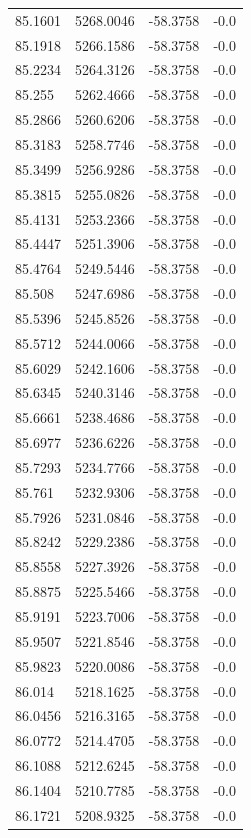 \begin{table}[H]
\begin{tabular}{llll}
85.1601 & 5268.0046 & -58.3758 & -0.0 \\
85.1918 & 5266.1586 & -58.3758 & -0.0 \\
85.2234 & 5264.3126 & -58.3758 & -0.0 \\
85.255 & 5262.4666 & -58.3758 & -0.0 \\
85.2866 & 5260.6206 & -58.3758 & -0.0 \\
85.3183 & 5258.7746 & -58.3758 & -0.0 \\
85.3499 & 5256.9286 & -58.3758 & -0.0 \\
85.3815 & 5255.0826 & -58.3758 & -0.0 \\
85.4131 & 5253.2366 & -58.3758 & -0.0 \\
85.4447 & 5251.3906 & -58.3758 & -0.0 \\
85.4764 & 5249.5446 & -58.3758 & -0.0 \\
85.508 & 5247.6986 & -58.3758 & -0.0 \\
85.5396 & 5245.8526 & -58.3758 & -0.0 \\
85.5712 & 5244.0066 & -58.3758 & -0.0 \\
85.6029 & 5242.1606 & -58.3758 & -0.0 \\
85.6345 & 5240.3146 & -58.3758 & -0.0 \\
85.6661 & 5238.4686 & -58.3758 & -0.0 \\
85.6977 & 5236.6226 & -58.3758 & -0.0 \\
85.7293 & 5234.7766 & -58.3758 & -0.0 \\
85.761 & 5232.9306 & -58.3758 & -0.0 \\
85.7926 & 5231.0846 & -58.3758 & -0.0 \\
85.8242 & 5229.2386 & -58.3758 & -0.0 \\
85.8558 & 5227.3926 & -58.3758 & -0.0 \\
85.8875 & 5225.5466 & -58.3758 & -0.0 \\
85.9191 & 5223.7006 & -58.3758 & -0.0 \\
85.9507 & 5221.8546 & -58.3758 & -0.0 \\
85.9823 & 5220.0086 & -58.3758 & -0.0 \\
86.014 & 5218.1625 & -58.3758 & -0.0 \\
86.0456 & 5216.3165 & -58.3758 & -0.0 \\
86.0772 & 5214.4705 & -58.3758 & -0.0 \\
86.1088 & 5212.6245 & -58.3758 & -0.0 \\
86.1404 & 5210.7785 & -58.3758 & -0.0 \\
86.1721 & 5208.9325 & -58.3758 & -0.0 \\

\end{tabular}
\end{table}
